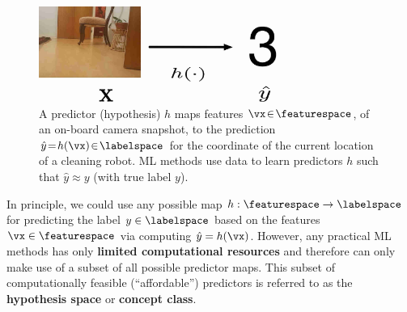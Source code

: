 \documentclass[12pt]{report}
\begin{document}
\begin{figure}[htbp]
%   
\begin{minipage}{\textwidth}
\begin{center}
   \includegraphics[width=0.7\textwidth]{HypoMap1.jpg}  
   \end{center}
\end{minipage}
\caption{A predictor (hypothesis) $h$ maps features $\vx\!\in\!\featurespace$, of 
	an on-board camera snapshot, to the prediction $\hat{y}\!=\!h(\vx)\!\in\!\labelspace$ 
	for the coordinate of the current location of a cleaning robot. ML methods use data 
	to learn predictors $h$ such that $\hat{y}\!\approx\!y$ (with true label $y$).}
\label{fig_feature_map_eval}
\end{figure}

In principle, we could use any possible map $h: \featurespace \rightarrow \labelspace$ 
for predicting the label $y \in \labelspace$ based on the features $\vx \in \featurespace$ 
via computing $\hat{y} = h(\vx)$. However, any practical ML methods has only {\bf limited 
	computational resources} and therefore can only make use of a subset of all possible 
predictor maps. This subset of computationally feasible (``affordable'') predictors is referred 
to as the {\bf hypothesis space} or {\bf concept class}. 
\end{document}
